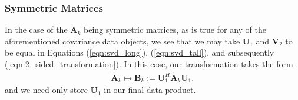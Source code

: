 \documentclass{article}
\begin{document}
\subsubsection{Symmetric Matrices}
\label{sec:symmetric_transformation} 
In the case of the $\mathbf{A}_k$ being symmetric matrices, as is true for any of the aforementioned covariance data objects, we see that we may take $\mathbf{U}_1$ and $\mathbf{V}_2$ to be equal in Equations (\ref{eqn:svd_long}), (\ref{eqn:svd_tall}), and subsequently (\ref{eqn:2_sided_transformation}). In this case, our transformation takes the form 
\begin{align} 
\mathbf{\tilde{A}}_k \mapsto \mathbf{B}_k := \mathbf{U}_1^H \mathbf{\tilde{A}}_k \mathbf{U}_1, \label{eqn:1_sided_transformation} 
\end{align} 
and we need only store $\mathbf{U}_1$ in our final data product. 
\end{document}
